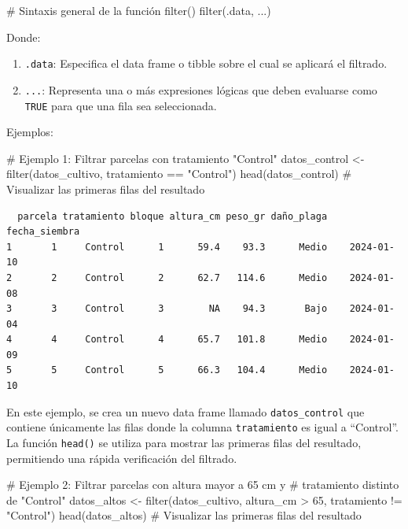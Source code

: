 \documentclass[
  spanish,
  a4paper,
  DIV=11,
  numbers=noendperiod,
  onepage,
  openany]{scrreprt}
\newenvironment{Shaded}{\begin{snugshade}}{\end{snugshade}}
\newcommand{\CommentTok}[1]{\textcolor[rgb]{0.37,0.37,0.37}{#1}}
\newcommand{\DecValTok}[1]{\textcolor[rgb]{0.68,0.00,0.00}{#1}}
\newcommand{\FunctionTok}[1]{\textcolor[rgb]{0.28,0.35,0.67}{#1}}
\newcommand{\NormalTok}[1]{\textcolor[rgb]{0.00,0.23,0.31}{#1}}
\newcommand{\OtherTok}[1]{\textcolor[rgb]{0.00,0.23,0.31}{#1}}
\newcommand{\SpecialCharTok}[1]{\textcolor[rgb]{0.37,0.37,0.37}{#1}}
\newcommand{\StringTok}[1]{\textcolor[rgb]{0.13,0.47,0.30}{#1}}
\begin{document}
\begin{Shaded}
\begin{Highlighting}[]
\CommentTok{\# Sintaxis general de la función filter()}
\FunctionTok{filter}\NormalTok{(.data, ...)}
\end{Highlighting}
\end{Shaded}

Donde:

\begin{enumerate}
\def\labelenumi{\arabic{enumi}.}
\item
  \texttt{.data}: Especifica el data frame o tibble sobre el cual se
  aplicará el filtrado.
\item
  \texttt{...}: Representa una o más expresiones lógicas que deben
  evaluarse como \texttt{TRUE} para que una fila sea seleccionada.
\end{enumerate}

Ejemplos:

\begin{Shaded}
\begin{Highlighting}[]
\CommentTok{\# Ejemplo 1: Filtrar parcelas con tratamiento "Control"}
\NormalTok{datos\_control }\OtherTok{\textless{}{-}} \FunctionTok{filter}\NormalTok{(datos\_cultivo, tratamiento }\SpecialCharTok{==} \StringTok{"Control"}\NormalTok{)}
\FunctionTok{head}\NormalTok{(datos\_control) }\CommentTok{\# Visualizar las primeras filas del resultado}
\end{Highlighting}
\end{Shaded}

\begin{verbatim}
  parcela tratamiento bloque altura_cm peso_gr daño_plaga fecha_siembra
1       1     Control      1      59.4    93.3      Medio    2024-01-10
2       2     Control      2      62.7   114.6      Medio    2024-01-08
3       3     Control      3        NA    94.3       Bajo    2024-01-04
4       4     Control      4      65.7   101.8      Medio    2024-01-09
5       5     Control      5      66.3   104.4      Medio    2024-01-10
\end{verbatim}

En este ejemplo, se crea un nuevo data frame llamado
\texttt{datos\_control} que contiene únicamente las filas donde la
columna \texttt{tratamiento} es igual a ``Control''. La función
\texttt{head()} se utiliza para mostrar las primeras filas del
resultado, permitiendo una rápida verificación del filtrado.

\begin{Shaded}
\begin{Highlighting}[]
\CommentTok{\# Ejemplo 2: Filtrar parcelas con altura mayor a 65 cm y }
           \CommentTok{\# tratamiento distinto de "Control"}
\NormalTok{datos\_altos }\OtherTok{\textless{}{-}} \FunctionTok{filter}\NormalTok{(datos\_cultivo, }
\NormalTok{                      altura\_cm }\SpecialCharTok{\textgreater{}} \DecValTok{65}\NormalTok{, tratamiento }\SpecialCharTok{!=} \StringTok{"Control"}\NormalTok{)}
\FunctionTok{head}\NormalTok{(datos\_altos) }\CommentTok{\# Visualizar las primeras filas del resultado}
\end{Highlighting}
\end{Shaded}
\end{document}

